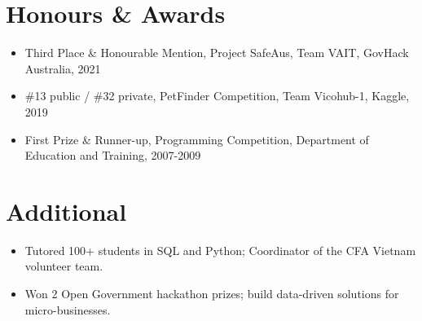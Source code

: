 \documentclass[11pt,a4paper]{article}
\begin{document}
\section*{Honours \& Awards}
\begin{itemize}
  \item Third Place \& Honourable Mention, Project SafeAus, Team VAIT, GovHack Australia, 2021
  \item \#13 public / \#32 private, PetFinder Competition, Team Vicohub-1, Kaggle, 2019
  \item First Prize \& Runner-up, Programming Competition, Department of Education and Training, 2007-2009
\end{itemize}

\section*{Additional}
\begin{itemize}
  \item Tutored 100+ students in SQL and Python; Coordinator of the CFA Vietnam volunteer team.
  \item Won 2 Open Government hackathon prizes; build data-driven solutions for micro-businesses.
\end{itemize}
\end{document}
